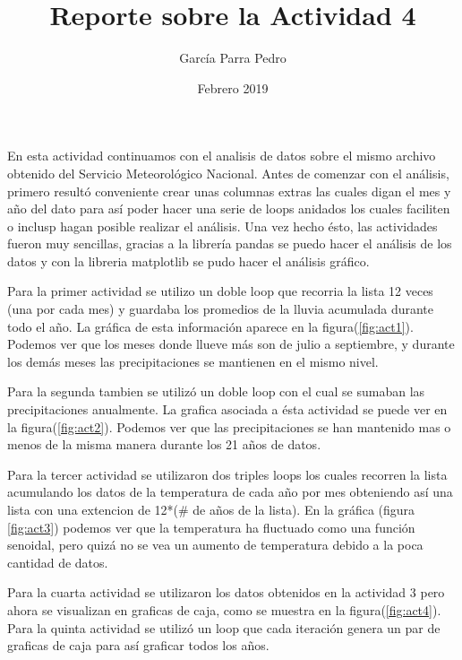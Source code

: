 \documentclass[12pt]{article}
\title{Reporte sobre la Actividad 4}
\author{García Parra Pedro}
\date{Febrero 2019}
\begin{document}
\maketitle

En esta actividad continuamos con el analisis de datos sobre el mismo archivo obtenido del Servicio Meteorológico Nacional.
Antes de comenzar con el análisis, primero resultó conveniente crear unas columnas extras las cuales digan el mes y año del dato para así poder hacer una serie de loops anidados los cuales faciliten o inclusp hagan posible realizar el análisis.
Una vez hecho ésto, las actividades fueron muy sencillas, gracias a la librería pandas se puedo hacer el análisis de los datos y con la libreria matplotlib se pudo hacer el análisis gráfico.

Para la primer actividad se utilizo un doble loop que recorria la lista 12 veces (una por cada mes) y guardaba los promedios de la lluvia acumulada durante todo el año. La gráfica de esta información aparece en la figura(\ref{fig:act1}). Podemos ver que los meses donde llueve más son de julio a septiembre, y durante los demás meses las precipitaciones se mantienen en el mismo nivel.

Para la segunda tambien se utilizó un doble loop con el cual se sumaban las precipitaciones anualmente. La grafica asociada a ésta actividad se puede ver en la figura(\ref{fig:act2}). Podemos ver que las precipitaciones se han mantenido mas o menos de la misma manera durante los 21 años de datos.

Para la tercer actividad se utilizaron dos triples loops los cuales recorren la lista acumulando los datos de la temperatura de cada año por mes obteniendo así una lista con una extencion de 12*(# de años de la lista). En la gráfica (figura \ref{fig:act3}) podemos ver que la temperatura ha fluctuado como una función senoidal, pero quizá no se vea un aumento de temperatura debido a la poca cantidad de datos.

Para la cuarta actividad se utilizaron los datos obtenidos en la actividad 3 pero ahora se visualizan en graficas de caja, como se muestra en la figura(\ref{fig:act4}). Para la quinta actividad se utilizó un loop que cada iteración genera un par de graficas de caja para así graficar todos los años.
\end{document}
